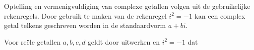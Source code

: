\documentclass{ximera}
\begin{document}
	\author{Zomercursus KU Leuven}
	\label{xim:cmplx_optellen_en_vermenigvuldigen}



    Optelling en vermenigvuldiging van complexe getallen volgen uit de gebruikelijke rekenregels.
    Door gebruik te maken van de rekenregel \(i^2 = -1\) kan een complex getal telkens geschreven worden in de standaardvorm \(a+bi\). 
    
    \begin{definition} Voor reële getallen $a,b,c,d$ geldt door uitwerken en $i^2=-1$ dat


    
    \end{definition}
\end{document}
